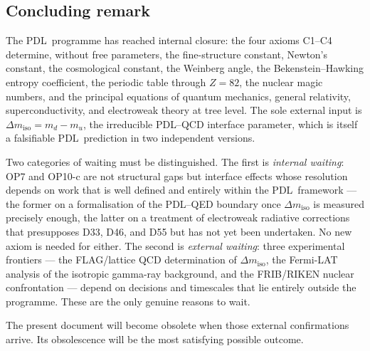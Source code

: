 \documentclass[12pt,a4paper]{article}
\theoremstyle{definition}
\newcommand{\PDL}{\textsc{PDL}}
\newcommand{\Dmiso}{\Delta m_{\mathrm{iso}}}
\begin{document}
\subsection{Concluding remark}

The \PDL\ programme has reached internal closure: the four axioms C1--C4 determine, without free parameters, the fine-structure constant, Newton's constant, the cosmological constant, the Weinberg angle, the Bekenstein--Hawking entropy coefficient, the periodic table through $Z = 82$, the nuclear magic numbers, and the principal equations of quantum mechanics, general relativity, superconductivity, and electroweak theory at tree level. The sole external input is $\Dmiso = m_d - m_u$, the irreducible \PDL--QCD interface parameter, which is itself a falsifiable \PDL\ prediction in two independent versions.

Two categories of waiting must be distinguished. The first is \emph{internal waiting}: OP7 and OP10-c are not structural gaps but interface effects whose resolution depends on work that is well defined and entirely within the \PDL\ framework --- the former on a formalisation of the \PDL--QED boundary once $\Dmiso$ is measured precisely enough, the latter on a treatment of electroweak radiative corrections that presupposes D33, D46, and D55 but has not yet been undertaken. No new axiom is needed for either. The second is \emph{external waiting}: three experimental frontiers --- the FLAG/lattice QCD determination of $\Dmiso$, the Fermi-LAT analysis of the isotropic gamma-ray background, and the FRIB/RIKEN nuclear confrontation --- depend on decisions and timescales that lie entirely outside the programme. These are the only genuine reasons to wait.

The present document will become obsolete when those external confirmations arrive. Its obsolescence will be the most satisfying possible outcome.

\clearpage


\end{document}
